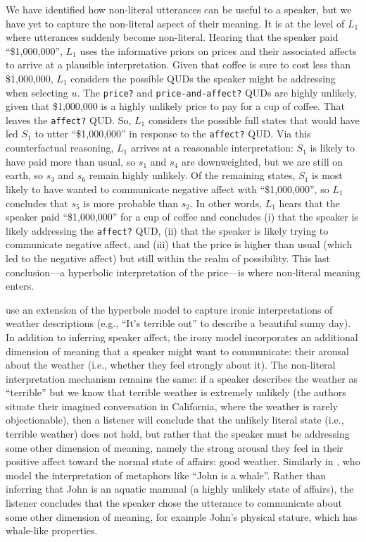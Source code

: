 \documentclass{sp}
\begin{document}
We have identified how non-literal utterances can be useful to a speaker, but we have yet to capture the non-literal aspect of their meaning. It is at the level of $L_1$ where utterances suddenly become non-literal. Hearing that the speaker paid ``\$1,000,000'', $L_1$ uses the informative priors on prices and their associated affects to arrive at a plausible interpretation. Given that coffee is sure to cost less than \$1,000,000, $L_1$ considers the possible QUDs the speaker might be addressing when selecting $u$. The \texttt{price?} and \texttt{price-and-affect?} QUDs are highly unlikely, given that \$1,000,000 is a highly unlikely price to pay for a cup of coffee. That leaves the \texttt{affect?} QUD. So, $L_1$ considers the possible full states that would have led $S_1$ to utter ``\$1,000,000'' in response to the \texttt{affect?} QUD. Via this counterfactual reasoning, $L_1$ arrives at a reasonable interpretation: $S_1$ is likely to have paid more than usual, so $s_1$ and $s_4$ are downweighted, but we are still on earth, so $s_3$ and $s_6$ remain highly unlikely. Of the remaining states, $S_1$ is most likely to have wanted to communicate negative affect with ``\$1,000,000'', so $L_1$ concludes that $s_5$ is more probable than $s_2$. In other words, $L_1$ hears that the speaker paid ``\$1,000,000'' for a cup of coffee and concludes (i) that the speaker is likely addressing the \texttt{affect?} QUD, (ii) that the speaker is likely trying to communicate negative affect, and (iii) that the price is higher than usual (which led to the negative affect) but still within the realm of possibility. This last conclusion---a hyperbolic interpretation of the price---is where non-literal meaning enters.

\cite{kaogoodman2015} use an extension of the hyperbole model to capture ironic interpretations of weather descriptions (e.g., ``It's terrible out'' to describe a beautiful sunny day). In addition to inferring speaker affect, the irony model incorporates an additional dimension of meaning that a speaker might want to communicate: their arousal about the weather (i.e., whether they feel strongly about it). The non-literal interpretation mechanism remains the same: if a speaker describes the weather as ``terrible'' but we know that terrible weather is extremely unlikely (the authors situate their imagined conversation in California, where the weather is rarely objectionable), then a listener will conclude that the unlikely literal state (i.e., terrible weather) does not hold, but rather that the speaker must be addressing some other dimension of meaning, namely the strong arousal they feel in their positive affect toward the normal state of affairs: good weather. Similarly in \cite{kaoetal2014metaphor}, who model the interpretation of metaphors like ``John is a whale''. Rather than inferring that John is an aquatic mammal (a highly unlikely state of affairs), the listener concludes that the speaker chose the utterance to communicate about some other dimension of meaning, for example John's physical stature, which has whale-like properties.
\end{document}
